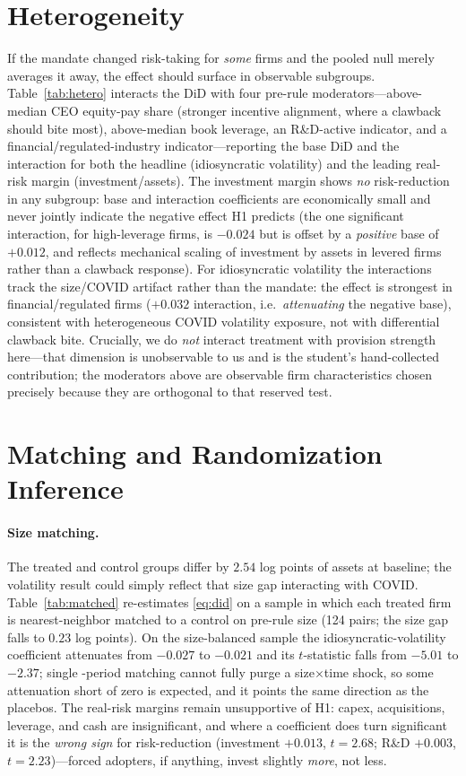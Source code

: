 \documentclass[12pt]{article}
\begin{document}
\section{Heterogeneity}\label{sec:het}
If the mandate changed risk-taking for \emph{some} firms and the pooled null merely averages it
away, the effect should surface in observable subgroups. Table~\ref{tab:hetero} interacts the
DiD with four pre-rule moderators---above-median CEO equity-pay share (stronger incentive
alignment, where a clawback should bite most), above-median book leverage, an R\&D-active
indicator, and a financial/regulated-industry indicator---reporting the base DiD and the
interaction for both the headline (idiosyncratic volatility) and the leading real-risk margin
(investment/assets). The investment margin shows \emph{no} risk-reduction in any subgroup: base
and interaction coefficients are economically small and never jointly indicate the negative
effect H1 predicts (the one significant interaction, for high-leverage firms, is $-0.024$ but is
offset by a \emph{positive} base of $+0.012$, and reflects mechanical scaling of investment by
assets in levered firms rather than a clawback response). For idiosyncratic volatility the
interactions track the size/COVID artifact rather than the mandate: the effect is strongest in
financial/regulated firms ($+0.032$ interaction, i.e.\ \emph{attenuating} the negative base),
consistent with heterogeneous COVID volatility exposure, not with differential clawback bite.
Crucially, we do \emph{not} interact treatment with provision strength here---that dimension is
unobservable to us and is the student's hand-collected contribution; the moderators above are
observable firm characteristics chosen precisely because they are orthogonal to that reserved
test.

\section{Matching and Randomization Inference}\label{sec:robust}
\paragraph{Size matching.} The treated and control groups differ by $2.54$ log points of assets
at baseline; the volatility result could simply reflect that size gap interacting with COVID.
Table~\ref{tab:matched} re-estimates \eqref{eq:did} on a sample in which each treated firm is
nearest-neighbor matched to a control on pre-rule size (124 pairs; the size gap falls to
$0.23$ log points). On the size-balanced sample the idiosyncratic-volatility coefficient
attenuates from $-0.027$ to $-0.021$ and its $t$-statistic falls from $-5.01$ to $-2.37$; single
-period matching cannot fully purge a size$\times$time shock, so some attenuation short of zero
is expected, and it points the same direction as the placebos. The real-risk margins remain
unsupportive of H1: capex, acquisitions, leverage, and cash are insignificant, and where a
coefficient does turn significant it is the \emph{wrong sign} for risk-reduction (investment
$+0.013$, $t=2.68$; R\&D $+0.003$, $t=2.23$)---forced adopters, if anything, invest slightly
\emph{more}, not less.
\end{document}

